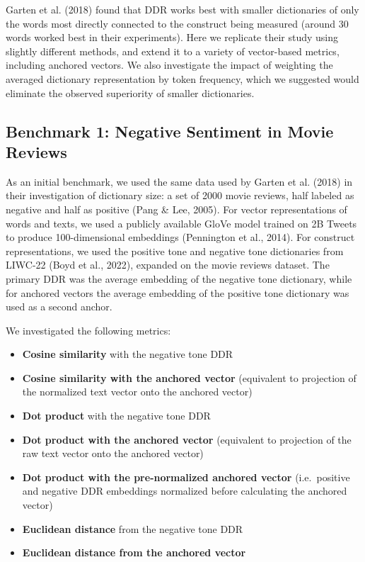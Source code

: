 \documentclass[
  man,
  floatsintext,
  longtable,
  nolmodern,
  notxfonts,
  notimes,
  colorlinks=true,linkcolor=blue,citecolor=blue,urlcolor=blue]{apa7}
\providecommand{\tightlist}{%
  \setlength{\itemsep}{0pt}\setlength{\parskip}{0pt}}
\begin{document}
Garten et al. (2018) found that DDR works best with smaller dictionaries
of only the words most directly connected to the construct being
measured (around 30 words worked best in their experiments). Here we
replicate their study using slightly different methods, and extend it to
a variety of vector-based metrics, including anchored vectors. We also
investigate the impact of weighting the averaged dictionary
representation by token frequency, which we suggested would eliminate
the observed superiority of smaller dictionaries.

\subsection{Benchmark 1: Negative Sentiment in Movie
Reviews}\label{benchmark-1-negative-sentiment-in-movie-reviews}

As an initial benchmark, we used the same data used by Garten et al.
(2018) in their investigation of dictionary size: a set of 2000 movie
reviews, half labeled as negative and half as positive (Pang \& Lee,
2005). For vector representations of words and texts, we used a publicly
available GloVe model trained on 2B Tweets to produce 100-dimensional
embeddings (Pennington et al., 2014). For construct representations, we
used the positive tone and negative tone dictionaries from LIWC-22 (Boyd
et al., 2022), expanded on the movie reviews dataset. The primary DDR
was the average embedding of the negative tone dictionary, while for
anchored vectors the average embedding of the positive tone dictionary
was used as a second anchor.

We investigated the following metrics:

\begin{itemize}
\tightlist
\item
  \textbf{Cosine similarity} with the negative tone DDR
\item
  \textbf{Cosine similarity with the anchored vector} (equivalent to
  projection of the normalized text vector onto the anchored vector)
\item
  \textbf{Dot product} with the negative tone DDR
\item
  \textbf{Dot product with the anchored vector} (equivalent to
  projection of the raw text vector onto the anchored vector)
\item
  \textbf{Dot product with the pre-normalized anchored vector}
  (i.e.~positive and negative DDR embeddings normalized before
  calculating the anchored vector)
\item
  \textbf{Euclidean distance} from the negative tone DDR
\item
  \textbf{Euclidean distance from the anchored vector}
\end{itemize}
\end{document}
